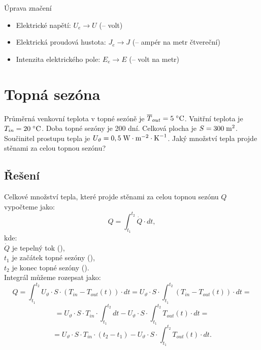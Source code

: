 \documentclass{article}
\begin{document}
\maketitle
\tableofcontents
\vspace{1cm}

\begin{dangerbox}{Úprava značení}
    \begin{itemize}
        \item Elektrické napětí: $U_e \rightarrow U$ (\ueqV \fs -- volt)
        \item Elektrická proudová hustota: $J_e \rightarrow J$ (\ueqAandMinvsq \fs -- ampér na metr čtvereční)
        \item Intenzita elektrického pole: $E_e \rightarrow E$ (\ueqVandMinv \fs -- volt na metr)
    \end{itemize}
\end{dangerbox}

\newpage




\section{ Topná sezóna \spicy \spicy \spicy}
Průměrná venkovní teplota v topné sezóně je $\overline{T}_{out} = 5 \; ^\circ \textrm{C}$. Vnitřní teplota je $T_{in} = 20 \; ^\circ \textrm{C}$. Doba topné sezóny je 200 dní. Celková plocha je $S = 300 \; \textrm{m}^{\textrm{2}}$. Součinitel prostupu tepla je $U_\vartheta = 0,5 \; \textrm{W} \cdot \textrm{m}^{-2} \cdot \textrm{K}^{-1}$. Jaký množství tepla projde stěnami za celou topnou sezónu?



\subsection{Řešení}
Celkové množství tepla, které projde stěnami za celou topnou sezónu $Q$ vypočteme jako:
$$
    Q = \int_{t_1}^{t_2} \dot{Q} \cdot dt,
$$
kde:\\
$\dot{Q}$ je tepelný tok (\ueqW),\\
$t_1$ je začátek topné sezóny (\uH),\\
$t_2$ je konec topné sezóny (\uH).\\

Integrál můžeme rozepsat jako:
$$
    Q = \int_{t_1}^{t_2} U_\vartheta \cdot S \cdot (T_{in} - T_{out} (t)) \cdot dt = U_\vartheta \cdot S \cdot \int_{t_1}^{t_2} (T_{in} - T_{out} (t)) \cdot dt =
$$
$$
    = U_\vartheta \cdot S \cdot T_{in} \cdot \int_{t_1}^{t_2} dt - U_\vartheta \cdot S \cdot \int_{t_1}^{t_2} T_{out} (t) \cdot dt =
$$
$$
    = U_\vartheta \cdot S \cdot T_{in} \cdot (t_2 - t_1) - U_\vartheta \cdot S \cdot \int_{t_1}^{t_2} T_{out} (t) \cdot dt.
$$
\end{document}
